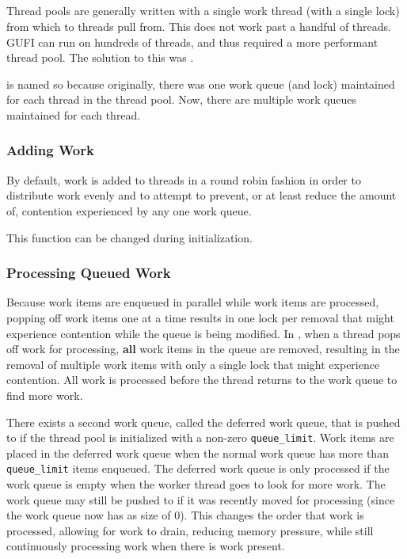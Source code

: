 \subsection{\qptp}
Thread pools are generally written with a single work thread (with a
single lock) from which to threads pull from. This does not work past
a handful of threads. GUFI can run on hundreds of threads, and thus
required a more performant thread pool. The solution to this was
\qptp.

\qptp is named so because originally, there was one work queue (and
lock) maintained for each thread in the thread pool. Now, there are
multiple work queues maintained for each thread.

\subsubsection{Adding Work}
By default, work is added to threads in a round robin fashion in order
to distribute work evenly and to attempt to prevent, or at least
reduce the amount of, contention experienced by any one work queue.

This function can be changed during initialization.

\subsubsection{Processing Queued Work}
Because work items are enqueued in parallel while work items are
processed, popping off work items one at a time results in one lock
per removal that might experience contention while the queue is being
modified. In \qptp, when a thread pops off work for processing, {\bf
 all} work items in the queue are removed, resulting in the removal
of multiple work items with only a single lock that might experience
contention. All work is processed before the thread returns to the
work queue to find more work.

There exists a second work queue, called the deferred work queue, that
is pushed to if the thread pool is initialized with a non-zero
\texttt{queue\_limit}. Work items are placed in the deferred work
queue when the normal work queue has more than \texttt{queue\_limit}
items enqueued. The deferred work queue is only processed if the work
queue is empty when the worker thread goes to look for more work. The
work queue may still be pushed to if it was recently moved for
processing (since the work queue now has as size of 0). This changes
the order that work is processed, allowing for work to drain, reducing
memory pressure, while still continuously
processing work when there is work present.

